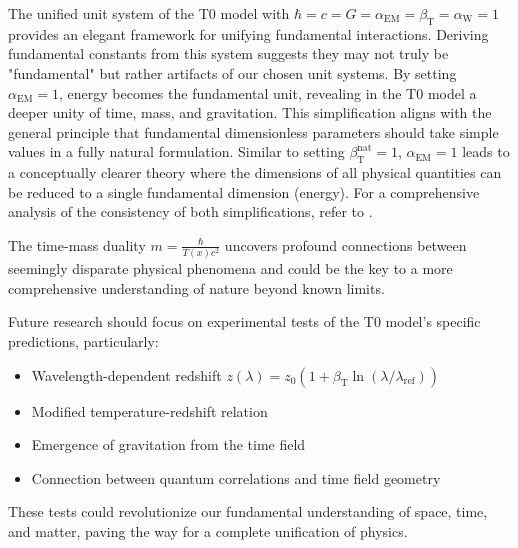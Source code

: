 \documentclass[12pt,a4paper]{article}
\newcommand{\Tfield}{T(x)}
\newcommand{\betaT}{\beta_{\text{T}}}
\newcommand{\alphaEM}{\alpha_{\text{EM}}}
\newcommand{\alphaW}{\alpha_{\text{W}}}
\begin{document}
	The unified unit system of the T0 model with \(\hbar = c = G = \alphaEM = \betaT = \alphaW = 1\) provides an elegant framework for unifying fundamental interactions. Deriving fundamental constants from this system suggests they may not truly be "fundamental" but rather artifacts of our chosen unit systems. By setting \(\alphaEM = 1\), energy becomes the fundamental unit, revealing in the T0 model a deeper unity of time, mass, and gravitation. This simplification aligns with the general principle that fundamental dimensionless parameters should take simple values in a fully natural formulation. Similar to setting \(\betaT^{\text{nat}} = 1\), \(\alphaEM = 1\) leads to a conceptually clearer theory where the dimensions of all physical quantities can be reduced to a single fundamental dimension (energy). For a comprehensive analysis of the consistency of both simplifications, refer to \cite{pascher_alphabeta_2025}.
	
	The time-mass duality \(m = \frac{\hbar}{\Tfield c^2}\) uncovers profound connections between seemingly disparate physical phenomena and could be the key to a more comprehensive understanding of nature beyond known limits.
	
	Future research should focus on experimental tests of the T0 model's specific predictions, particularly:
	
	\begin{itemize}
		\item Wavelength-dependent redshift \(z(\lambda) = z_0 (1 + \betaT \ln(\lambda/\lambda_{\text{ref}}))\)
		\item Modified temperature-redshift relation
		\item Emergence of gravitation from the time field
		\item Connection between quantum correlations and time field geometry
	\end{itemize}
	
	These tests could revolutionize our fundamental understanding of space, time, and matter, paving the way for a complete unification of physics.
	
\end{document}
